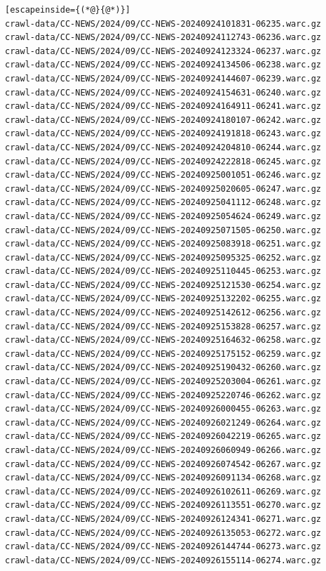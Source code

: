 \begin{lstlisting}[escapeinside={(*@}{@*)}]
crawl-data/CC-NEWS/2024/09/CC-NEWS-20240924101831-06235.warc.gz
crawl-data/CC-NEWS/2024/09/CC-NEWS-20240924112743-06236.warc.gz
crawl-data/CC-NEWS/2024/09/CC-NEWS-20240924123324-06237.warc.gz
crawl-data/CC-NEWS/2024/09/CC-NEWS-20240924134506-06238.warc.gz
crawl-data/CC-NEWS/2024/09/CC-NEWS-20240924144607-06239.warc.gz
crawl-data/CC-NEWS/2024/09/CC-NEWS-20240924154631-06240.warc.gz
crawl-data/CC-NEWS/2024/09/CC-NEWS-20240924164911-06241.warc.gz
crawl-data/CC-NEWS/2024/09/CC-NEWS-20240924180107-06242.warc.gz
crawl-data/CC-NEWS/2024/09/CC-NEWS-20240924191818-06243.warc.gz
crawl-data/CC-NEWS/2024/09/CC-NEWS-20240924204810-06244.warc.gz
crawl-data/CC-NEWS/2024/09/CC-NEWS-20240924222818-06245.warc.gz
crawl-data/CC-NEWS/2024/09/CC-NEWS-20240925001051-06246.warc.gz
crawl-data/CC-NEWS/2024/09/CC-NEWS-20240925020605-06247.warc.gz
crawl-data/CC-NEWS/2024/09/CC-NEWS-20240925041112-06248.warc.gz
crawl-data/CC-NEWS/2024/09/CC-NEWS-20240925054624-06249.warc.gz
crawl-data/CC-NEWS/2024/09/CC-NEWS-20240925071505-06250.warc.gz
crawl-data/CC-NEWS/2024/09/CC-NEWS-20240925083918-06251.warc.gz
crawl-data/CC-NEWS/2024/09/CC-NEWS-20240925095325-06252.warc.gz
crawl-data/CC-NEWS/2024/09/CC-NEWS-20240925110445-06253.warc.gz
crawl-data/CC-NEWS/2024/09/CC-NEWS-20240925121530-06254.warc.gz
crawl-data/CC-NEWS/2024/09/CC-NEWS-20240925132202-06255.warc.gz
crawl-data/CC-NEWS/2024/09/CC-NEWS-20240925142612-06256.warc.gz
crawl-data/CC-NEWS/2024/09/CC-NEWS-20240925153828-06257.warc.gz
crawl-data/CC-NEWS/2024/09/CC-NEWS-20240925164632-06258.warc.gz
crawl-data/CC-NEWS/2024/09/CC-NEWS-20240925175152-06259.warc.gz
crawl-data/CC-NEWS/2024/09/CC-NEWS-20240925190432-06260.warc.gz
crawl-data/CC-NEWS/2024/09/CC-NEWS-20240925203004-06261.warc.gz
crawl-data/CC-NEWS/2024/09/CC-NEWS-20240925220746-06262.warc.gz
crawl-data/CC-NEWS/2024/09/CC-NEWS-20240926000455-06263.warc.gz
crawl-data/CC-NEWS/2024/09/CC-NEWS-20240926021249-06264.warc.gz
crawl-data/CC-NEWS/2024/09/CC-NEWS-20240926042219-06265.warc.gz
crawl-data/CC-NEWS/2024/09/CC-NEWS-20240926060949-06266.warc.gz
crawl-data/CC-NEWS/2024/09/CC-NEWS-20240926074542-06267.warc.gz
crawl-data/CC-NEWS/2024/09/CC-NEWS-20240926091134-06268.warc.gz
crawl-data/CC-NEWS/2024/09/CC-NEWS-20240926102611-06269.warc.gz
crawl-data/CC-NEWS/2024/09/CC-NEWS-20240926113551-06270.warc.gz
crawl-data/CC-NEWS/2024/09/CC-NEWS-20240926124341-06271.warc.gz
crawl-data/CC-NEWS/2024/09/CC-NEWS-20240926135053-06272.warc.gz
crawl-data/CC-NEWS/2024/09/CC-NEWS-20240926144744-06273.warc.gz
crawl-data/CC-NEWS/2024/09/CC-NEWS-20240926155114-06274.warc.gz

\end{lstlisting}
